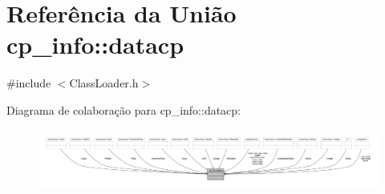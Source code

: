 \hypertarget{unioncp__info_1_1datacp}{}\section{Referência da União cp\+\_\+info\+:\+:datacp}
\label{unioncp__info_1_1datacp}


{\ttfamily \#include $<$Class\+Loader.\+h$>$}



Diagrama de colaboração para cp\+\_\+info\+:\+:datacp\+:
\nopagebreak
\begin{figure}[H]
\begin{center}
\leavevmode
\includegraphics[width=350pt]{unioncp__info_1_1datacp__coll__graph}
\end{center}
\end{figure}

